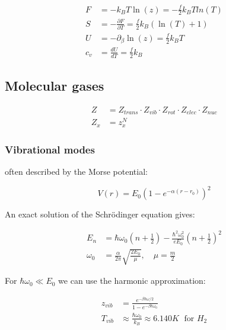 \begin{equation*}
    \begin{aligned}
        F &= -k_B T \ln(z) = - \frac{f}{2} k_B T ln(T) \\
        S &= - \frac{\partial F}{\partial T} = \frac{f}{2} k_B (\ln(T)+1) \\
        U &= - \partial_\beta \ln (z) = \frac{f}{2} k_B T \\
        c_v &= \frac{dU}{dT} = \frac{f}{2} k_B
    \end{aligned}
\end{equation*}

\subsection*{Molecular gases}

\begin{equation*}
    \begin{aligned}
        Z &= Z_{trans} \cdot Z_{vib} \cdot Z_{rot} \cdot Z_{elec} \cdot Z_{nuc} \\
        Z_x &= z_x^N
    \end{aligned}
\end{equation*}

\subsubsection*{Vibrational modes}
often described by the Morse potential:

\begin{equation*}
    V(r) = E_0 \left(1- e^{-\alpha (r-r_0)}\right)^2
\end{equation*}

An exact solution of the Schrödinger equation gives:

\begin{equation*}
    \begin{aligned}
        E_n &= \hbar \omega_0 \left(n + \frac{1}{2}\right) - \frac{\hbar^2 \omega_0^2}{e E_0} \left(n + \frac{1}{2}\right)^2 \\
        \omega_0 &= \frac{\alpha}{2 \pi} \sqrt{\frac{2 E_0}{\mu}} , \quad \mu = \frac{m}{2}
    \end{aligned}
\end{equation*}

For $\hbar \omega_0 \ll E_0 $ we can use the harmonic approximation:

\begin{equation*}
    \begin{aligned}
        z_{vib} &= \frac{e^{-\beta \hbar \omega /2}}{1- e^{- \beta \hbar \omega_0}}\\
        T_{vib} &\approx \frac{\hbar \omega_0}{k_B} \approx 6.140 K \; \text{ for } H_2
    \end{aligned}
\end{equation*}

